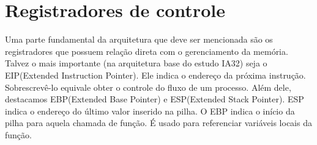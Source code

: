 	\section{Registradores de controle}
	Uma parte fundamental da arquitetura que deve ser mencionada são os registradores que possuem
	relação direta com o gerenciamento da memória.
	Talvez o mais importante (na arquitetura base do estudo IA32) seja o EIP(Extended Instruction Pointer).
	Ele indica o endereço da próxima instrução. Sobrescrevê-lo equivale obter o controle
	do fluxo de um processo.
	Além dele, destacamos EBP(Extended Base Pointer) e ESP(Extended Stack Pointer).
	ESP indica o endereço do último valor inserido na pilha.
	O EBP indica o início da pilha para aquela chamada de função. É usado para referenciar variáveis
	locais da função.



